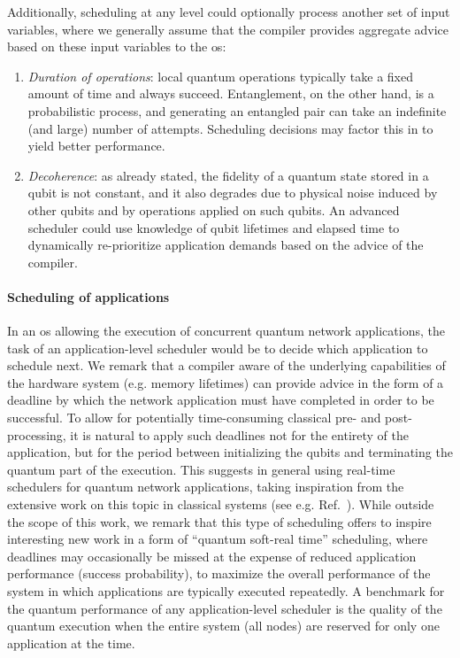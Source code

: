 Additionally, scheduling at any level could optionally process another set of input variables, where
we generally assume that the compiler provides aggregate advice based on these input variables to
the \acrshort{os}:

\begin{enumerate}
    \item \emph{Duration of operations}: local quantum operations typically take a fixed amount of
          time and always succeed. Entanglement, on the other hand, is a probabilistic process, and
          generating an entangled pair can take an indefinite (and large) number of attempts.
          Scheduling decisions may factor this in to yield better performance.
    \item \emph{Decoherence}: as already stated, the fidelity of a quantum state stored in a qubit
          is not constant, and it also degrades due to physical noise induced by other qubits and by
          operations applied on such qubits. An advanced scheduler could use knowledge of qubit
          lifetimes and elapsed time to dynamically re-prioritize application demands based on the
          advice of the compiler.
\end{enumerate}

\paragraph{Scheduling of applications}

In an \acrshort{os} allowing the execution of concurrent quantum network applications, the task of
an application-level scheduler would be to decide which application to schedule next. We remark that
a compiler aware of the underlying capabilities of the hardware system (e.g. memory lifetimes) can
provide advice in the form of a deadline by which the network application must have completed in
order to be successful. To allow for potentially time-consuming classical pre- and post-processing,
it is natural to apply such deadlines not for the entirety of the application, but for the period
between initializing the qubits and terminating the quantum part of the execution. This suggests in
general using real-time schedulers for quantum network applications, taking inspiration from the
extensive work on this topic in classical systems (see e.g. Ref.~\cite{liu_1973_scheduling}). While
outside the scope of this work, we remark that this type of scheduling offers to inspire interesting
new work in a form of ``quantum soft-real time'' scheduling, where deadlines may occasionally be
missed at the expense of reduced application performance (success probability), to maximize the
overall performance of the system in which applications are typically executed repeatedly. A
benchmark for the quantum performance of any application-level scheduler is the quality of the
quantum execution when the entire system (all nodes) are reserved for only one application at the
time.

